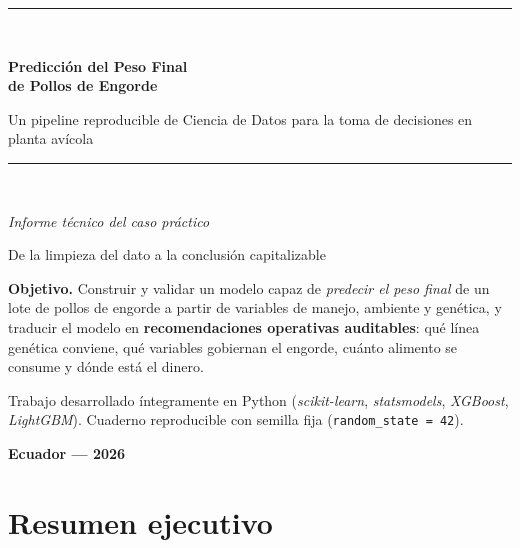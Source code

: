 \documentclass[11pt,a4paper]{article}
\begin{document}
\begin{titlepage}
\centering
\vspace*{1.2cm}
{\color{azulcorp}\rule{\linewidth}{1.4pt}}\\[0.5cm]
{\Huge\bfseries\color{azulcorp} Predicción del Peso Final\\[0.2cm] de Pollos de Engorde\par}
\vspace{0.35cm}
{\Large Un pipeline reproducible de Ciencia de Datos para la toma de decisiones en planta avícola\par}
\vspace{0.25cm}
{\color{azulcorp}\rule{\linewidth}{1.4pt}}\\[1.4cm]

{\large\itshape Informe técnico del caso práctico\par}
\vspace{0.4cm}
{\large De la limpieza del dato a la conclusión capitalizable\par}
\vspace{2.2cm}

\begin{minipage}{0.85\textwidth}\centering\small
\textbf{Objetivo.} Construir y validar un modelo capaz de \emph{predecir el peso final} de un lote de
pollos de engorde a partir de variables de manejo, ambiente y genética, y traducir el modelo en
\textbf{recomendaciones operativas auditables}: qué línea genética conviene, qué variables
gobiernan el engorde, cuánto alimento se consume y dónde está el dinero.
\end{minipage}

\vfill
{\small Trabajo desarrollado íntegramente en Python (\textit{scikit-learn}, \textit{statsmodels},
\textit{XGBoost}, \textit{LightGBM}). Cuaderno reproducible con semilla fija (\texttt{random\_state = 42}).\par}
\vspace{0.3cm}
{\small\textbf{Ecuador — 2026}\par}
\end{titlepage}

\tableofcontents
\thispagestyle{empty}
\clearpage

\section{Resumen ejecutivo}
\end{document}
